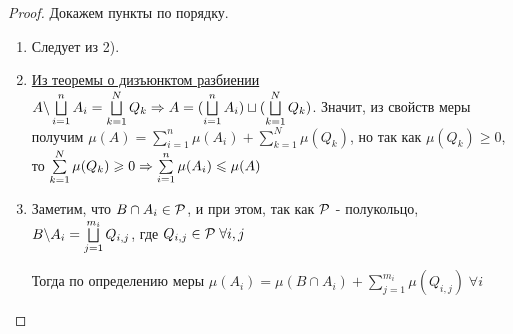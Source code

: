 \begin{proof} Докажем пункты по порядку.
\begin{enumerate}
    \item Следует из 2).
    \item \hyperlink{disjoint_union}{Из теоремы о дизъюнктом разбиении} $A \backslash \bigsqcup\limits_{i = 1}^{n} A_i = \bigsqcup\limits_{k = 1}^{N} Q_k \Rightarrow A = (\bigsqcup\limits_{i = 1}^{n} A_i) \sqcup (\bigsqcup\limits_{k = 1}^{N} Q_k)$. Значит, из свойств меры получим $\mu(A) = \sum\limits_{i = 1}^{n}\mu(A_i) + \sum\limits_{k = 1}^{N}\mu(Q_k)$, но так как $\mu(Q_k) \geq 0$, то $\sum\limits_{k = 1}^{N}\mu(Q_k) \geqslant 0 \Rightarrow \sum\limits_{i = 1}^{n}\mu(A_i) \leqslant \mu(A)$
    \item Заметим, что $B \cap A_i \in \mathcal{P}$, и при этом, так как $\mathcal{P}$ - полукольцо, $B \backslash A_i = \bigsqcup\limits_{j = 1}^{m_i} Q_{i,j}$, где $Q_{i, j} \in \mathcal{P} \; \forall i, j$

    Тогда по определению меры $\mu(A_i) = \mu(B \cap A_i) + \sum\limits_{j = 1}^{m_i}\mu(Q_{i, j}) \; \forall i$



    
    
\end{enumerate}
\end{proof}